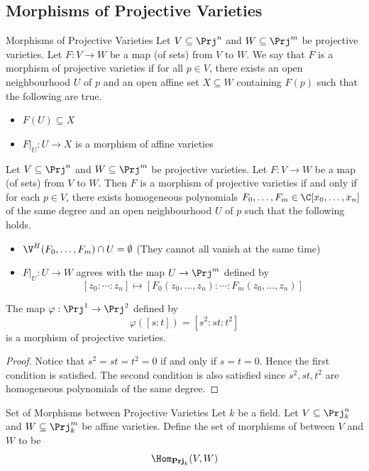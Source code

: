 \documentclass[a4paper]{article}
\begin{document}
\subsection{Morphisms of Projective Varieties}
\begin{defn}{Morphisms of Projective Varieties}{} Let $V\subseteq\Prj^n$ and $W\subseteq\Prj^m$ be projective varieties. Let $F:V\to W$ be a map (of sets) from $V$ to $W$. We say that $F$ is a morphism of projective varieties if for all $p\in V$, there exists an open neighbourhood $U$ of $p$ and an open affine set $X\subseteq W$ containing $F(p)$ such that the following are true. 
\begin{itemize}
\item $F(U)\subseteq X$
\item $F|_U:U\to X$ is a morphism of affine varieties
\end{itemize}
\end{defn}

\begin{prp}{}{} Let $V\subseteq\Prj^n$ and $W\subseteq\Prj^m$ be projective varieties. Let $F:V\to W$ be a map (of sets) from $V$ to $W$. Then $F$ is a morphism of projective varieties if and only if for each $p\in V$, there exists homogeneous polynomials $F_0,\dots,F_m\in\C[x_0,\dots,x_n]$ of the same degree and an open neighbourhood $U$ of $p$ such that the following holds. 
\begin{itemize}
\item $\V^H(F_0,\dots,F_m)\cap U=\emptyset$ (They cannot all vanish at the same time)
\item $F|_U:U\to W$ agrees with the map $U\to\Prj^m$ defined by $$[z_0:\cdots:z_n]\mapsto[F_0(z_0,\dots,z_n):\cdots:F_m(z_0,\dots,z_n)]$$
\end{itemize}
\end{prp}

\begin{eg}{}{} The map $\varphi:\Prj^1\to\Prj^2$ defined by $$\varphi([s:t])=[s^2:st:t^2]$$ is a morphism of projective varieties. 
\begin{proof}
Notice that $s^2=st=t^2=0$ if and only if $s=t=0$. Hence the first condition is satisfied. The second condition is also satisfied since $s^2,st,t^2$ are homogeneous polynomials of the same degree. 
\end{proof}
\end{eg}

\begin{defn}{Set of Morphisms between Projective Varieties}{} Let $k$ be a field. Let $V\subseteq\Prj_k^n$ and $W\subseteq\Prj_k^m$ be affine varieties. Define the set of morphisms of between $V$ and $W$ to be $$\Hom_{\bold{Prj}_k}(V,W)$$
\end{defn}
\end{document}
